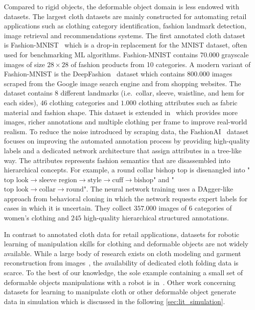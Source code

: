 \documentclass[\home/main.tex]{subfiles}
\begin{document}
Compared to rigid objects, the deformable object domain is less endowed with datasets. The largest cloth datasets are mainly constructed for automating retail applications such as clothing category identification, fashion landmark detection, image retrieval and recommendations systems. The first annotated cloth dataset is Fashion-MNIST~\autocite{fashionmnist} which is a drop-in replacement for the MNIST dataset, often used for benchmarking ML algorithms. Fashion-MNIST contains $70.000$ grayscale images of size $28\times28$ of fashion products from 10 categories. A modern variant of Fashion-MNIST is the DeepFashion~\autocite{DeepFashion} dataset which contains $800.000$ images scraped from the Google image search engine and from shopping websites. The dataset contains $8$ different landmarks (i.e.\ collar, sleeve, waistline, and hem for each sides), $46$ clothing categories and $1.000$ clothing attributes such as fabric material and fashion shape. This dataset is extended in~\autocite{DeepFashion2} which provides more images, richer annotations and multiple clothing per frame to improve real-world realism. To reduce the noise introduced by scraping data, the FashionAI~\autocite{FashionAI} dataset focuses on improving the automated annotation process by providing high-quality labels and a dedicated network architecture that assign attributes in a tree-like way. The attributes represents fashion semantics that are disassembled into hierarchical concepts. For example, a round collar bishop top is disenangled into "$\text{top look} \rightarrow \text{sleeve region} \rightarrow \text{style} \rightarrow \text{cuff} \rightarrow \text{bishop}$" and  "$\text{top look} \rightarrow \text{collar} \rightarrow \text{round}$". The neural network training uses a DAgger-like approach from behavioral cloning in which the network requests expert labels for cases in which it is uncertain. They collect $357.000$ images of $6$ categories of women's clothing and $245$ high-quality hierarchical structured annotations.

In contrast to annotated cloth data for retail applications, datasets for robotic learning of manipulation skills for clothing and deformable objects are not widely available. While a large body of research exists on cloth modeling and garment reconstruction from images~\autocite{bertiche2020cloth3d,deepfashion3d,Wang20183dgarment}, the availability of dedicated cloth folding data is scarce. To the best of our knowledge, the sole example containing a small set of deformable objects manipulations with a robot is in~\autocite{mandlekar2018roboturk}. Other work concerning datasets for learning to manipulate cloth or other deformable object generate data in simulation which is discussed in the following \cref{sec:lit_simulation}.
 
\end{document}
